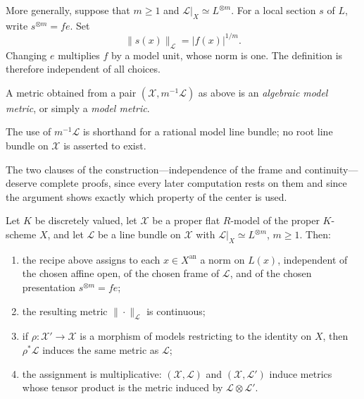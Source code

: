 More generally, suppose that $m\geq1$ and
$\mathcal L|_X\simeq L^{\otimes m}$. For a local section $s$ of $L$,
write $s^{\otimes m}=fe$. Set
\[
                         \|s(x)\|_{\mathcal L}=|f(x)|^{1/m}.
\]
Changing $e$ multiplies $f$ by a model unit, whose norm is one. The
definition is therefore independent of all choices.

\begin{definition}
\label{def:metrics-algebraic-model}
A metric obtained from a pair $(\mathcal X,m^{-1}\mathcal L)$ as above is
an \emph{algebraic model metric}, or simply a \emph{model metric}.
\end{definition}

The use of $m^{-1}\mathcal L$ is shorthand for a rational model line
bundle; no root line bundle on $\mathcal X$ is asserted to exist.

The two clauses of the construction---independence of the frame and
continuity---deserve complete proofs, since every later computation rests on
them and since the argument shows exactly which property of the center is
used.

\begin{proposition}
\label{prop:metrics-model-continuous}
Let $K$ be discretely valued, let $\mathcal X$ be a proper flat
$R$-model of the proper $K$-scheme $X$, and let $\mathcal L$ be a
line bundle on $\mathcal X$ with $\mathcal L|_X\simeq L^{\otimes m}$,
$m\ge1$. Then:
\begin{enumerate}
\item the recipe above assigns to each $x\in X^{\mathrm{an}}$ a norm on
$L(x)$, independent of the chosen affine open, of the chosen frame of
$\mathcal L$, and of the chosen presentation $s^{\otimes m}=fe$;
\item the resulting metric $\|\cdot\|_{\mathcal L}$ is continuous;
\item if $\rho:\mathcal X'\to\mathcal X$ is a morphism of models
restricting to the identity on $X$, then $\rho^*\mathcal L$ induces the
same metric as $\mathcal L$;
\item the assignment is multiplicative: $(\mathcal X,\mathcal L)$ and
$(\mathcal X,\mathcal L')$ induce metrics whose tensor product is the
metric induced by $\mathcal L\otimes\mathcal L'$.
\end{enumerate}
\end{proposition}

